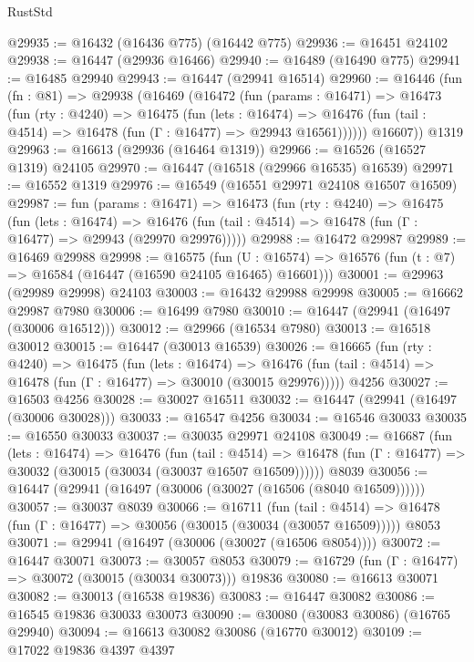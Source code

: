 \begin{lexlean}{RustStd}
\begin{coremodule}
{\begin{coremodule}
{{{{{{{{{{{{{{{{{{{{{{{{{{{{{{{{{{{{{{{{{{{{{{{{{{{{{{{@29935 := @16432 (@16436 @775) (@16442 @775)
@29936 := @16451 @24102
@29938 := @16447 (@29936 @16466)
@29940 := @16489 (@16490 @775)
@29941 := @16485 @29940
@29943 := @16447 (@29941 @16514)
@29960 := @16446
    (fun (fn : @81) =>
    @29938
      (@16469
        (@16472
          (fun (params : @16471) =>
          @16473
            (fun (rty : @4240) =>
            @16475
              (fun (lets : @16474) =>
              @16476 (fun (tail : @4514) => @16478 (fun (Γ : @16477) => @29943 @16561))))))
        @16607))
    @1319
@29963 := @16613 (@29936 (@16464 @1319))
@29966 := @16526 (@16527 @1319) @24105
@29970 := @16447 (@16518 (@29966 @16535) @16539)
@29971 := @16552 @1319
@29976 := @16549 (@16551 @29971 @24108 @16507 @16509)
@29987 := fun (params : @16471) =>
  @16473
    (fun (rty : @4240) =>
    @16475
      (fun (lets : @16474) =>
      @16476 (fun (tail : @4514) => @16478 (fun (Γ : @16477) => @29943 (@29970 @29976)))))
@29988 := @16472 @29987
@29989 := @16469 @29988
@29998 := @16575
    (fun (U : @16574) => @16576 (fun (t : @7) => @16584 (@16447 (@16590 @24105 @16465) @16601)))
@30001 := @29963 (@29989 @29998) @24103
@30003 := @16432 @29988 @29998
@30005 := @16662 @29987 @7980
@30006 := @16499 @7980
@30010 := @16447 (@29941 (@16497 (@30006 @16512)))
@30012 := @29966 (@16534 @7980)
@30013 := @16518 @30012
@30015 := @16447 (@30013 @16539)
@30026 := @16665
    (fun (rty : @4240) =>
    @16475
      (fun (lets : @16474) =>
      @16476 (fun (tail : @4514) => @16478 (fun (Γ : @16477) => @30010 (@30015 @29976)))))
    @4256
@30027 := @16503 @4256
@30028 := @30027 @16511
@30032 := @16447 (@29941 (@16497 (@30006 @30028)))
@30033 := @16547 @4256
@30034 := @16546 @30033
@30035 := @16550 @30033
@30037 := @30035 @29971 @24108
@30049 := @16687
    (fun (lets : @16474) =>
    @16476
      (fun (tail : @4514) =>
      @16478 (fun (Γ : @16477) => @30032 (@30015 (@30034 (@30037 @16507 @16509))))))
    @8039
@30056 := @16447 (@29941 (@16497 (@30006 (@30027 (@16506 (@8040 @16509))))))
@30057 := @30037 @8039
@30066 := @16711
    (fun (tail : @4514) => @16478 (fun (Γ : @16477) => @30056 (@30015 (@30034 (@30057 @16509)))))
    @8053
@30071 := @29941 (@16497 (@30006 (@30027 (@16506 @8054))))
@30072 := @16447 @30071
@30073 := @30057 @8053
@30079 := @16729 (fun (Γ : @16477) => @30072 (@30015 (@30034 @30073))) @19836
@30080 := @16613 @30071
@30082 := @30013 (@16538 @19836)
@30083 := @16447 @30082
@30086 := @16545 @19836 @30033 @30073
@30090 := @30080 (@30083 @30086) (@16765 @29940)
@30094 := @16613 @30082 @30086 (@16770 @30012)
@30109 := @17022
    @19836
    @4397
    @4397
}}}}}}}}}}}}}}}}}}}}}}}}}}}}}}}}}}}}}}}}}}}}}}}}}}}}}}}
\end{coremodule}}
\end{coremodule}
\end{lexlean}
